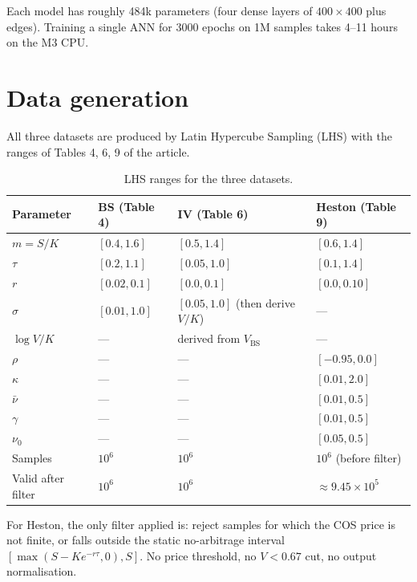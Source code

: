 \documentclass[11pt,a4paper]{article}
\newcommand{\bs}{\mathrm{BS}}
\begin{document}
Each model has roughly 484k parameters (four dense layers of $400 \times 400$
plus edges). Training a single ANN for 3000 epochs on 1M samples takes
4--11 hours on the M3 CPU.

\section{Data generation}
\label{sec:data}

All three datasets are produced by Latin Hypercube Sampling (LHS) with the
ranges of Tables 4, 6, 9 of the article.

\begin{table}[H]
\centering
\caption{LHS ranges for the three datasets.}
\label{tab:lhs}
\begin{tabular}{llll}
\toprule
\textbf{Parameter} & \textbf{BS (Table 4)} & \textbf{IV (Table 6)} & \textbf{Heston (Table 9)} \\
\midrule
$m = S/K$    & $[0.4, 1.6]$   & $[0.5, 1.4]$                & $[0.6, 1.4]$ \\
$\tau$       & $[0.2, 1.1]$   & $[0.05, 1.0]$               & $[0.1, 1.4]$ \\
$r$          & $[0.02, 0.1]$  & $[0.0, 0.1]$                & $[0.0, 0.10]$ \\
$\sigma$     & $[0.01, 1.0]$  & $[0.05, 1.0]$ (then derive $V/K$) & --- \\
$\log V/K$   & ---            & derived from $V_{\bs}$      & --- \\
$\rho$       & ---            & ---                         & $[-0.95, 0.0]$ \\
$\kappa$     & ---            & ---                         & $[0.01, 2.0]$ \\
$\bar\nu$    & ---            & ---                         & $[0.01, 0.5]$ \\
$\gamma$     & ---            & ---                         & $[0.01, 0.5]$ \\
$\nu_0$      & ---            & ---                         & $[0.05, 0.5]$ \\
\midrule
Samples       & $10^6$ & $10^6$ & $10^6$ (before filter) \\
Valid after filter & $10^6$ & $10^6$ & $\approx 9.45 \times 10^5$ \\
\bottomrule
\end{tabular}
\end{table}

For Heston, the only filter applied is: reject samples for which the COS
price is not finite, or falls outside the static no-arbitrage interval
$[\max(S - K e^{-r\tau}, 0), S]$. No price threshold, no $V < 0.67$ cut, no
output normalisation.
\end{document}
